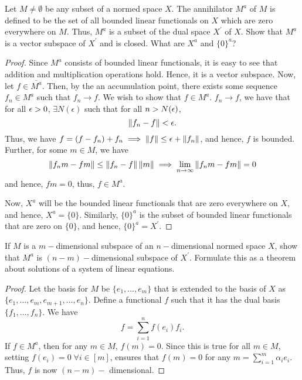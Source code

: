 \begin{question}
    
    Let $M \neq \emptyset$ be any subset of a normed space $X$. The annihilator $M^a$ of $M$ is defined to be the set of all bounded linear functionals on $X$ which are zero everywhere on $M$. Thus, $M^a$ is a subset of the dual space $X^\prime$ of $X$. Show that $M^a$ is a vector subspace of $X^\prime$ and is closed. What are $X^a$ and $\{0\}^a$?
    \label{section2.10-13}
\end{question}
\begin{proof}
       Since $M^a$ consists of bounded linear functionals, it is easy to see that addition and multiplication operations hold. Hence, it is a vector subspace. Now, let $f \in \overline{M^a}$. Then, by the an accumulation point, there exists some sequence $f_n \in M^a$ such that $f_n \rightarrow f$. We wish to show that $f \in M^a$. $f_n \rightarrow f$, we have that for all $\epsilon > 0$, $\exists N(\epsilon)$ such that for all $n > N(\epsilon)$, 
       \[\left\lVert f_n - f \right\rVert < \epsilon.\]
       Thus, we have $f = (f - f_n) + f_n \implies \left\lVert f \right\rVert \leq \epsilon + \left\lVert f_n \right\rVert$, and hence, $f$ is bounded. Further, for some $m \in M$, we have
       \[\left\lVert f_n m - fm \right\rVert \leq \left\lVert f_n - f \right\rVert \left\lVert m \right\rVert \implies \lim_{n \rightarrow \infty} \left\lVert f_n m - fm \right\rVert = 0\]
       and hence, $fm = 0$, thus, $f \in M^a$.

       Now, $X^a$ will be the bounded linear functionals that are zero everywhere on $X$, and hence, $X^a = \{0\}$. Similarly, $\{0\}^a$ is the subset of bounded linear functionals that are zero on $\{0\}$, and hence, $\{0\}^a = X^\prime$.
\end{proof}

\begin{question}
    If $M$ is a $m-$dimensional subspace of an $n-$dimensional normed space $X$, show that $M^a$ is $(n-m)-$dimensional subspace of $X^\prime$. Formulate this as a theorem about solutions of a system of linear equations.
    \label{section2.10-14}
\end{question}
\begin{proof}
        Let the basis for $M$ be $\{e_1 , \ldots , e_m\}$ that is extended to the basis of $X$ as $\{e_1 , \ldots , e_m , e_{m+1} , \ldots , e_n\}$. Define a functional $f$ such that it has the dual basis $\{f_1 , \ldots , f_n\}$. We have
        \[f = \sum_{i=1}^n f(e_i)f_i.\]
        If $f \in M ^a$, then for any $m \in M$, $f(m) = 0$. Since this is true for all $m \in M$, setting $f(e_i) = 0 \;\forall i\in[m] $, ensures that $f(m) = 0$ for any $m = \sum_{i=1}^m \alpha_i e_i.$ Thus, $f$ is now $(n-m)-$ dimensional. 
\end{proof}


